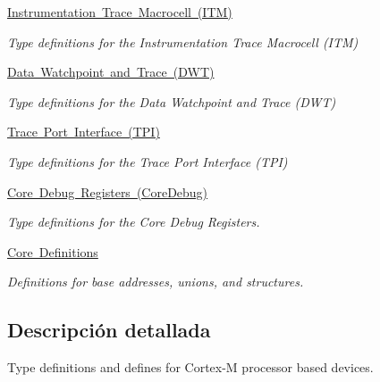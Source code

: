 \begin{DoxyCompactItemize}
\mbox{\hyperlink{group___c_m_s_i_s___i_t_m}{Instrumentation Trace Macrocell (\+I\+T\+M)}}
\begin{DoxyCompactList}\small\item\em Type definitions for the Instrumentation Trace Macrocell (I\+TM) \end{DoxyCompactList}\item 
\mbox{\hyperlink{group___c_m_s_i_s___d_w_t}{Data Watchpoint and Trace (\+D\+W\+T)}}
\begin{DoxyCompactList}\small\item\em Type definitions for the Data Watchpoint and Trace (D\+WT) \end{DoxyCompactList}\item 
\mbox{\hyperlink{group___c_m_s_i_s___t_p_i}{Trace Port Interface (\+T\+P\+I)}}
\begin{DoxyCompactList}\small\item\em Type definitions for the Trace Port Interface (T\+PI) \end{DoxyCompactList}\item 
\mbox{\hyperlink{group___c_m_s_i_s___core_debug}{Core Debug Registers (\+Core\+Debug)}}
\begin{DoxyCompactList}\small\item\em Type definitions for the Core Debug Registers. \end{DoxyCompactList}\item 
\mbox{\hyperlink{group___c_m_s_i_s__core__base}{Core Definitions}}
\begin{DoxyCompactList}\small\item\em Definitions for base addresses, unions, and structures. \end{DoxyCompactList}\end{DoxyCompactItemize}


\subsection{Descripción detallada}
Type definitions and defines for Cortex-\/M processor based devices. 

